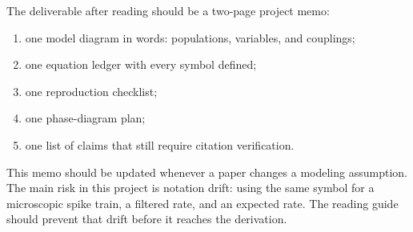 The deliverable after reading should be a two-page project memo:
%
\begin{enumerate}[leftmargin=*]
  \item one model diagram in words: populations, variables, and couplings;
  \item one equation ledger with every symbol defined;
  \item one reproduction checklist;
  \item one phase-diagram plan;
  \item one list of claims that still require citation verification.
\end{enumerate}

This memo should be updated whenever a paper changes a modeling assumption. The main risk in this project is notation drift: using the same symbol for a microscopic spike train, a filtered rate, and an expected rate. The reading guide should prevent that drift before it reaches the derivation.
